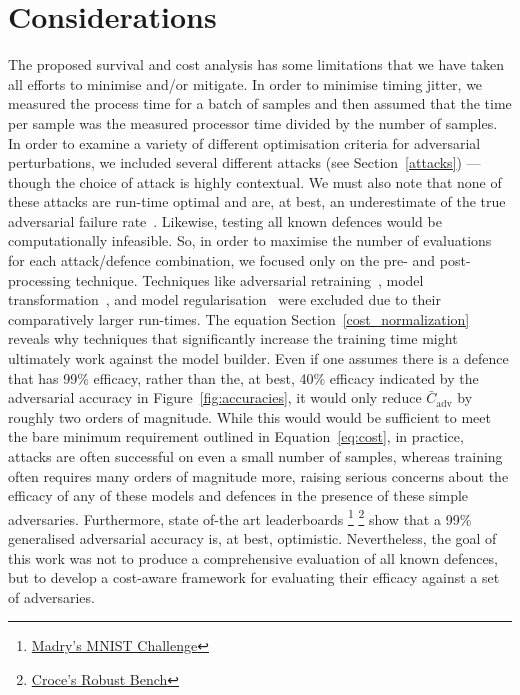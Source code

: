 \clearpage
\section{Considerations}
The proposed survival and cost analysis  has some limitations that we have taken all efforts to minimise and/or mitigate.
In order to minimise timing jitter, we measured the process time for a batch of samples and then assumed that the time per sample was the measured processor time divided by the number of samples.
In order to examine a variety of different optimisation criteria for adversarial perturbations, we included several different attacks (see Section~\ref{attacks}) --- though the choice of attack is highly contextual.
We must also note that none of these attacks are run-time optimal and are, at best, an underestimate of the true adversarial failure rate~\cite{meyers}.
Likewise, testing all known defences would be computationally infeasible. So, in order to maximise the number of evaluations for each attack/defence combination, we focused only on the pre- and post-processing technique.
Techniques like adversarial retraining~\cite{croce_reliable_2020}, model transformation~\cite{papernot_distillation_2016}, and model regularisation~\cite{jakubovitz2018improving} were excluded due to their comparatively larger run-times. The equation Section~\ref{cost_normalization} reveals why techniques that significantly increase the training time might ultimately work against the model builder.
Even if one assumes there is a defence that has 99\% efficacy, rather than the, at best, 40\% efficacy indicated by the adversarial accuracy in Figure~\ref{fig:accuracies}, it would only reduce $\bar{C}_{\mathrm{adv}}$ by roughly two orders of magnitude.
While this would would be sufficient to meet the bare minimum requirement outlined in Equation~\ref{eq:cost}, in practice, attacks are often successful on even a small number of samples, whereas training often requires many orders of magnitude more, raising serious concerns about the efficacy of any of these models and defences in the presence of these simple adversaries.
Furthermore, state of-the art leaderboards
\footnote{\href{https://github.com/MadryLab/mnist\_challenge}{Madry's MNIST Challenge}}
\footnote{\href{https://ml.cs.tsinghua.edu.cn/adv\-bench/}{Croce's Robust Bench}}
show that a 99\% generalised adversarial accuracy is, at best, optimistic. Nevertheless, the goal of this work was not to produce a comprehensive evaluation of all known defences, but to develop a cost-aware framework for evaluating their efficacy against a set of adversaries.

